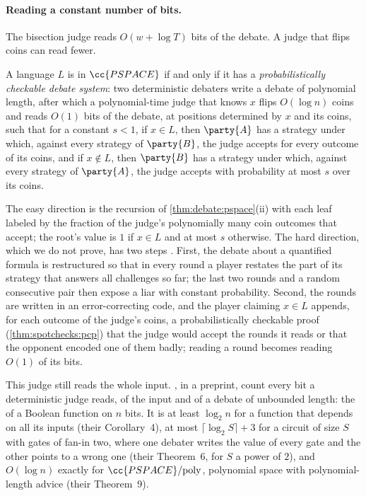 \begin{refsection}
\paragraph{Reading a constant number of bits.} The bisection judge reads $O(w+\log T)$ bits of the debate. A judge that flips coins can read fewer.

\begin{theorem}\label{thm:debate:pcd}
A language $L$ is in $\cc{PSPACE}$ if and only if it has a \emph{probabilistically checkable debate system}: two deterministic debaters write a debate of polynomial length, after which a polynomial-time judge that knows $x$ flips $O(\log n)$ coins and reads $O(1)$ bits of the debate, at positions determined by $x$ and its coins, such that for a constant $s<1$, if $x\in L$, then $\party{A}$ has a strategy under which, against every strategy of $\party{B}$, the judge accepts for every outcome of its coins, and if $x\notin L$, then $\party{B}$ has a strategy under which, against every strategy of $\party{A}$, the judge accepts with probability at most $s$ over its coins.
\end{theorem}

\begin{proofsketch}
The easy direction is the recursion of \cref{thm:debate:pspace}(ii) with each leaf labeled by the fraction of the judge's polynomially many coin outcomes that accept; the root's value is $1$ if $x\in L$ and at most $s$ otherwise. The hard direction, which we do not prove, has two steps \parencite[\S3, Theorems~3 and~2]{CondonEtAl1995}. First, the debate about a quantified formula is restructured so that in every round a player restates the part of its strategy that answers all challenges so far; the last two rounds and a random consecutive pair then expose a liar with constant probability. Second, the rounds are written in an error-correcting code, and the player claiming $x\in L$ appends, for each outcome of the judge's coins, a probabilistically checkable proof (\cref{thm:spotchecks:pcp}) that the judge would accept the rounds it reads or that the opponent encoded one of them badly; reading a round becomes reading $O(1)$ of its bits.
\end{proofsketch}

This judge still reads the whole input. \Textcite{BrownCohenEtAl2026Query}, in a preprint, count every bit a deterministic judge reads, of the input and of a debate of unbounded length: the  of a Boolean function on $n$ bits. It is at least $\log_2n$ for a function that depends on all its inputs (their Corollary~4), at most $\lceil\log_2S\rceil+3$ for a circuit of size $S$ with gates of fan-in two, where one debater writes the value of every gate and the other points to a wrong one (their Theorem~6, for $S$ a power of $2$), and $O(\log n)$ exactly for $\cc{PSPACE}/\mathrm{poly}$, polynomial space with polynomial-length advice (their Theorem~9).


\end{refsection}
